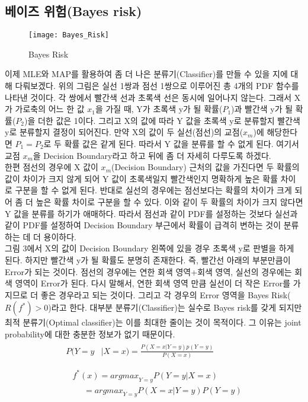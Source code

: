 \documentclass[a4paper]{oblivoir}
\begin{document}
\subsection{베이즈 위험(Bayes risk)}
\begin{figure}[ht]\centering
\texttt{[image: Bayes\_Risk]}\caption{Bayes Risk}\label{Fig:3-3}
\end{figure}
\indent 이제 MLE와 MAP를 활용하여 좀 더 나은 분류기(Classifier)를 만들 수 있을 지에 대해 다뤄보겠다. 위의 그림은 실선 1쌍과 점선 1쌍으로 이루어진 총 4개의 PDF 함수를 나타낸 것이다. 각 쌍에서 빨간색 선과 초록색 선은 동시에 일어나지 않는다. 그래서 X가  가로축의 어느 한 값 $x_1$을 가질 때, Y가 초록색 y가 될 확률($P_1$)과 빨간색 y가 될 확률($P_2$)을 더한 값은 1이다. 그리고 X의 값에 따라 Y 값을 초록색 y로 분류할지 빨간색 y로 분류할지 결정이 되어진다. 만약 X의 값이 두 실선(점선)의 교점($x_m$)에 해당한다면 $P_1=P_2$로 두 확률 값은 같게 된다. 따라서 Y 값을 분류를 할 수 없게 된다. 여기서 교점 $x_m$을 Decision Boundary라고 하고 뒤에 좀 더 자세히 다루도록 하겠다.\\
\indent 한편 점선의 경우에 X 값이 $x_m$(Decision Boundary) 근처의 값을 가진다면 두 확률의 값이 차이가 크지 않게 되어 Y 값이 초록색일지 빨간색인지 명확하게 높은 확률 차이로 구분을 할 수 없게 된다. 반대로 실선의 경우에는 점선보다는 확률의 차이가 크게 되어 좀 더 높은 확률 차이로 구분을 할 수 있다. 이와 같이 두 확률의 차이가 크지 않다면 Y 값을 분류를 하기가 애매하다. 따라서 점선과 같이 PDF를 설정하는 것보다 실선과 같이 PDF를 설정하여 Decision Boundary 부근에서 확률이 급격히 변하는 것이 분류하는 데 더 용이하다.\\
\indent 그림 3에서 X의 값이 Decision Boundary 왼쪽에 있을 경우 초록색 y로 판별을 하게 된다. 하지만 빨간색 y가 될 확률도 분명히 존재한다. 즉, 빨간선 아래의 부분만큼이 Error가 되는 것이다. 점선의 경우에는 연한 회색 영역+회색 영역, 실선의 경우에는 회색 영역이 Error가 된다. 다시 말해서, 연한 회색 영역 만큼 실선이 더 작은 Error를 가지므로 더 좋은 경우라고 되는 것이다. 그리고 각 경우의 Error 영역을 Bayes Risk($R(f^*)>0$)라고 한다. 대부분 분류기(Classifier)는 실수로 Bayes risk를 갖게 되지만 최적 분류기(Optimal classifier)는 이를 최대한 줄이는 것이 목적이다. 그 이유는 joint probability에 대한 충분한 정보가 없기 때문이다.
\begin{align}
\begin{split}
P(Y=y&|X=x)=\frac{P(X=x|Y=y)p(Y=y)}{P(X=x)}\\
\end{split}\\
\begin{split}
&f^*(x)={argmax}_{Y=y}P(Y=y|X=x)\\
&\ \ \ \ \ \ ={argmax}_{Y=y} P(X=x|Y=y)P(Y=y)
\end{split}
\label{eq:3-13}
\end{align}
\\
\end{document}
